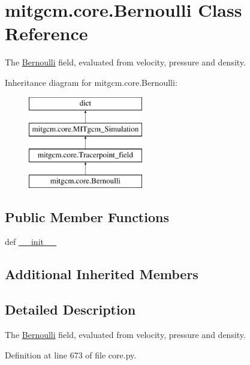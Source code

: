 \hypertarget{classmitgcm_1_1core_1_1Bernoulli}{\section{mitgcm.\+core.\+Bernoulli Class Reference}
\label{classmitgcm_1_1core_1_1Bernoulli}
}


The \hyperlink{classmitgcm_1_1core_1_1Bernoulli}{Bernoulli} field, evaluated from velocity, pressure and density.  


Inheritance diagram for mitgcm.\+core.\+Bernoulli\+:\begin{figure}[H]
\begin{center}
\leavevmode
\includegraphics[height=4.000000cm]{classmitgcm_1_1core_1_1Bernoulli}
\end{center}
\end{figure}
\subsection*{Public Member Functions}
\begin{DoxyCompactItemize}
\item 
def \hyperlink{classmitgcm_1_1core_1_1Bernoulli_a823e52977dd3ac349fb569eb3a4bf167}{\+\_\+\+\_\+init\+\_\+\+\_\+}
\end{DoxyCompactItemize}
\subsection*{Additional Inherited Members}


\subsection{Detailed Description}
The \hyperlink{classmitgcm_1_1core_1_1Bernoulli}{Bernoulli} field, evaluated from velocity, pressure and density. 



Definition at line 673 of file core.\+py.



